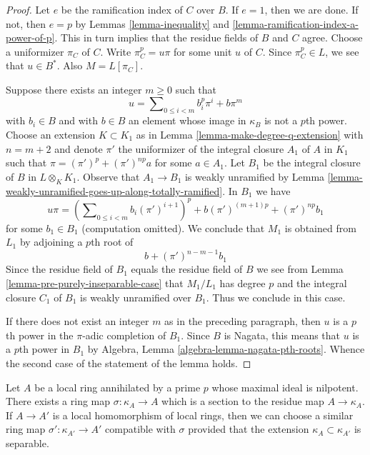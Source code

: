 \begin{proof}
Let $e$ be the ramification index of $C$ over $B$. If $e = 1$, then we are
done. If not, then $e = p$ by Lemmas \ref{lemma-inequality} and
\ref{lemma-ramification-index-a-power-of-p}.
This in turn implies that the residue fields of $B$ and $C$ agree.
Choose a uniformizer $\pi_C$ of $C$.
Write $\pi_C^p = u \pi$ for some unit $u$ of $C$.
Since $\pi_C^p \in L$, we see that $u \in B^*$. Also $M = L[\pi_C]$.

\medskip\noindent
Suppose there exists an integer $m \geq 0$ such that
$$
u = \sum\nolimits_{0 \leq i < m} b_i^p \pi^i + b \pi^m
$$
with $b_i \in B$ and with $b \in B$ an element whose image in $\kappa_B$
is not a $p$th power. Choose an extension $K \subset K_1$ as in
Lemma \ref{lemma-make-degree-q-extension}
with $n = m + 2$ and denote $\pi'$ the uniformizer
of the integral closure $A_1$ of $A$ in $K_1$ such that
$\pi = (\pi')^p + (\pi')^{np} a$ for some $a \in A_1$.
Let $B_1$ be the integral closure of $B$ in $L \otimes_K K_1$.
Observe that $A_1 \to B_1$ is weakly unramified by
Lemma \ref{lemma-weakly-unramified-goes-up-along-totally-ramified}.
In $B_1$ we have
$$
u \pi =
\left(\sum\nolimits_{0 \leq i < m} b_i (\pi')^{i + 1}\right)^p +
b (\pi')^{(m + 1)p} + (\pi')^{np} b_1
$$
for some $b_1 \in B_1$ (computation omitted).
We conclude that $M_1$ is obtained from
$L_1$ by adjoining a $p$th root of
$$
b + (\pi')^{n - m - 1} b_1
$$
Since the residue field of $B_1$ equals the residue field of $B$
we see from Lemma \ref{lemma-pre-purely-inseparable-case}
that $M_1/L_1$ has degree $p$ and
the integral closure $C_1$ of $B_1$ is weakly unramified over $B_1$.
Thus we conclude in this case.

\medskip\noindent
If there does not exist an integer $m$ as in the preceding paragraph,
then $u$ is a $p$th power in the $\pi$-adic completion of $B_1$.
Since $B$ is Nagata, this means that $u$ is a $p$th power in $B_1$
by Algebra, Lemma \ref{algebra-lemma-nagata-pth-roots}.
Whence the second case of the statement of the lemma holds.
\end{proof}

\begin{lemma}
\label{lemma-cohen}
Let $A$ be a local ring annihilated by a prime $p$ whose maximal ideal is
nilpotent. There exists a ring map $\sigma : \kappa_A \to A$
which is a section to the residue map $A \to \kappa_A$. If $A \to A'$ is
a local homomorphism of local rings, then we can choose a similar
ring map $\sigma' : \kappa_{A'} \to A'$ compatible with $\sigma$ provided
that the extension $\kappa_A \subset \kappa_{A'}$ is separable.
\end{lemma}

